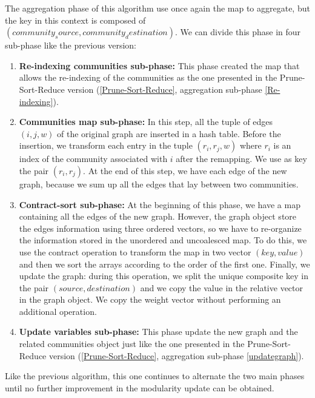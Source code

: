The aggregation phase of this algorithm use once again the map to aggregate, but the key in this context is composed of $(community_source, community_destination)$. We can divide this phase in four sub-phase like the previous version:
\begin{enumerate}
	\item \textbf{Re-indexing communities sub-phase:} This phase created the map that allows the re-indexing of the communities as the one presented in the Prune-Sort-Reduce version (\ref{Prune-Sort-Reduce}, aggregation sub-phase \ref{Re-indexing}).
	\item \textbf{Communities map sub-phase:} In this step, all the tuple of edges $(i, j, w)$ of the original graph are inserted in a hash table. Before the insertion, we transform each entry in the tuple $(r_i, r_j, w)$ where $r_i$ is an index of the community associated with $i$ after the remapping. We use as key the pair $(r_i, r_j)$. At the end of this step, we have each edge of the new graph, because we sum up all the edges that lay between two communities.
	\item \textbf{Contract-sort sub-phase:} At the beginning of this phase, we have a map containing all the edges of the new graph. However, the graph object store the edges information using three ordered vectors, so we have to re-organize the information stored in the unordered and uncoalesced map. To do this, we use the contract operation to transform the map in two vector $(key, value)$ and then we sort the arrays according to the order of the first one. Finally, we update the graph: during this operation, we split the unique composite key in the pair $(source, destination)$ and we copy the value in the relative vector in the graph object. We copy the weight vector without performing an additional operation. 
	\item \textbf{Update variables sub-phase:} This phase update the new graph and the related communities object just like the one presented in the Prune-Sort-Reduce version (\ref{Prune-Sort-Reduce}, aggregation sub-phase \ref{updategraph}).
\end{enumerate}
Like the previous algorithm, this one continues to alternate the two main phases until no further improvement in the modularity update can be obtained.
